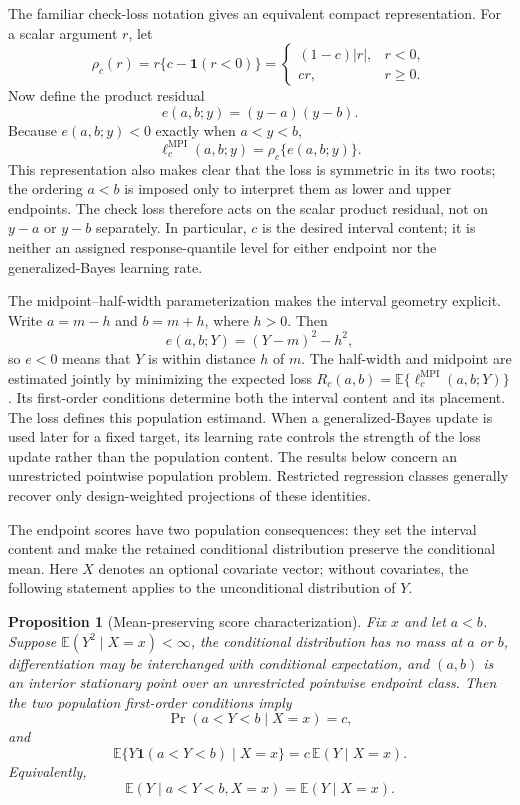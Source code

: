 \documentclass[11pt]{article}
\numberwithin{equation}{section}
\newcommand{\E}{\mathbb{E}}
\newcommand{\ind}{\mathbf{1}}
\newtheorem{proposition}{Proposition}
\begin{document}
The familiar check-loss notation gives an equivalent compact representation.
For a scalar argument \(r\), let
\[
\rho_c(r)=r\{c-\ind(r<0)\}
=
\begin{cases}
(1-c)|r|, & r<0,\\
cr, & r\ge0.
\end{cases}
\]
Now define the product residual
\[
e(a,b;y)=(y-a)(y-b).
\]
Because \(e(a,b;y)<0\) exactly when \(a<y<b\),
\begin{equation}
\ell_c^{\mathrm{MPI}}(a,b;y)=\rho_c\{e(a,b;y)\}.
\label{eq:mpi-product-check}
\end{equation}
This representation also makes clear that the loss is symmetric in its two
roots; the ordering \(a<b\) is imposed only to interpret them as lower and
upper endpoints.
The check loss therefore acts on the scalar product residual, not on
\(y-a\) or \(y-b\) separately. In particular, \(c\) is the desired interval
content; it is neither an assigned response-quantile level for either endpoint
nor the generalized-Bayes learning rate.

The midpoint--half-width parameterization makes the interval geometry
explicit. Write \(a=m-h\) and \(b=m+h\), where \(h>0\). Then
\[
e(a,b;Y)=(Y-m)^2-h^2,
\]
so \(e<0\) means that \(Y\) is within distance \(h\) of \(m\). The half-width
and midpoint are estimated jointly by minimizing the expected loss
\(R_c(a,b)=\E\{\ell_c^{\mathrm{MPI}}(a,b;Y)\}\). Its first-order conditions determine both
the interval content and its placement. The loss defines this population
estimand. When a generalized-Bayes update is used later for a fixed target, its
learning rate controls the strength of the loss update rather than the
population content. The results below concern an unrestricted pointwise
population problem. Restricted regression classes generally recover only
design-weighted projections of these identities.

The endpoint scores have two population consequences: they set the interval
content and make the retained conditional distribution preserve the conditional
mean. Here \(X\) denotes an optional covariate vector; without covariates,
the following statement applies to the unconditional distribution of \(Y\).

\begin{proposition}[Mean-preserving score characterization]
\label{prop:population-characterization}
Fix \(x\) and let \(a<b\). Suppose
\(\E(Y^2\mid X=x)<\infty\), the conditional distribution has no mass at \(a\)
or \(b\), differentiation may be interchanged with conditional expectation,
and \((a,b)\) is an interior stationary point over an unrestricted pointwise
endpoint class. Then the two population first-order conditions imply
\[
\Pr(a<Y<b\mid X=x)=c,
\]
and
\[
\E\{Y\ind(a<Y<b)\mid X=x\}
=c\,\E(Y\mid X=x).
\]
Equivalently,
\[
\E(Y\mid a<Y<b,X=x)=\E(Y\mid X=x).
\]
\end{proposition}
\end{document}
